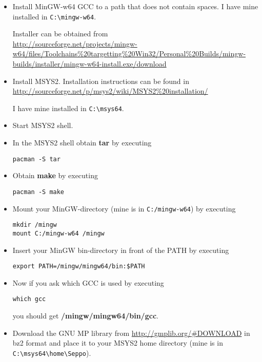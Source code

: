 \documentclass[a4paper,oneside,11.000000pt]{book}
\begin{document}
\begin{itemize}

\item
Install MinGW-w64 GCC to a path that does not contain spaces.
I have mine installed in \verb|C:\mingw-w64|.

Installer can be obtained from\\
\url{http://sourceforge.net/projects/mingw-w64/files/Toolchains%20targetting%20Win32/Personal%20Builds/mingw-builds/installer/mingw-w64-install.exe/download}

\item
Install MSYS2.
Installation instructions can be found in\\
\url{http://sourceforge.net/p/msys2/wiki/MSYS2%20installation/}

I have mine installed in \verb|C:\msys64|.

\item
Start MSYS2 shell.

\item
In the MSYS2 shell obtain \textbf{tar} by executing
\begin{verbatim}
pacman -S tar
\end{verbatim}

\item
Obtain \textbf{make} by executing
\begin{verbatim}
pacman -S make
\end{verbatim}

\item
Mount your MinGW-directory (mine is in \verb|C:/mingw-w64|) by executing
\begin{verbatim}
mkdir /mingw
mount C:/mingw-w64 /mingw
\end{verbatim}

\item
Insert your MinGW bin-directory in front of the PATH by executing
\begin{verbatim}
export PATH=/mingw/mingw64/bin:$PATH
\end{verbatim}

\item
Now if you ask which GCC is used by executing
\begin{verbatim}
which gcc
\end{verbatim}
you should get \textbf{/mingw/mingw64/bin/gcc}.

\item
Download the GNU MP library from \url{http://gmplib.org/#DOWNLOAD} in bz2 format
and place it to your MSYS2 home directory (mine is in \verb|C:\msys64\home\Seppo|).


\end{itemize}
\end{document}
